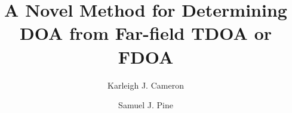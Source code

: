 \documentclass[12pt]{amsart}
\theoremstyle{definition}
\theoremstyle{remark}
\begin{document}
\title{A Novel Method for Determining DOA from Far-field TDOA or FDOA}
\author{Karleigh J. Cameron }
\author{Samuel J. Pine } %




\maketitle







%










\end{document}
